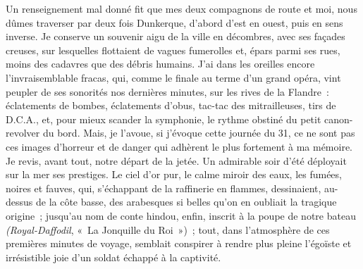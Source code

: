 \documentclass[french,twoside]{book} %
\begin{document}
Un renseignement mal donné fit que mes deux compagnons de route et moi, nous dûmes traverser par deux fois Dunkerque, d’abord d’est en ouest, puis en sens inverse. Je conserve un souvenir aigu de la ville en décombres, avec ses façades creuses, sur   lesquelles flottaient de vagues fumerolles et, épars parmi ses rues, moins des cadavres que des débris humains. J’ai dans les oreilles encore l’invraisemblable fracas, qui, comme le finale au terme d’un grand opéra, vint peupler de ses sonorités nos dernières minutes, sur les rives de la Flandre : éclatements de bombes, éclatements d’obus, tac-tac des mitrailleuses, tirs de D.C.A., et, pour mieux scander la symphonie, le rythme obstiné du petit canon-revolver du bord. Mais, je l’avoue, si j’évoque cette journée du 31, ce ne sont pas ces images d’horreur et de danger qui adhèrent le plus fortement à ma mémoire. Je revis, avant tout, notre départ de la jetée. Un admirable soir d’été déployait sur la mer ses prestiges. Le ciel d’or pur, le calme miroir des eaux, les fumées, noires et fauves, qui, s’échappant de la raffinerie en flammes, dessinaient, au-dessus de la côte basse, des arabesques si belles qu’on en oubliait la tragique origine ; jusqu’au nom de conte hindou, enfin, inscrit à la poupe de notre bateau {\itshape (Royal-Daffodil}, « La Jonquille du Roi ») ; tout, dans l’atmosphère de ces premières minutes de voyage, semblait conspirer à rendre plus pleine l’égoïste et irrésistible joie d’un soldat échappé à la captivité.\par
\end{document}
